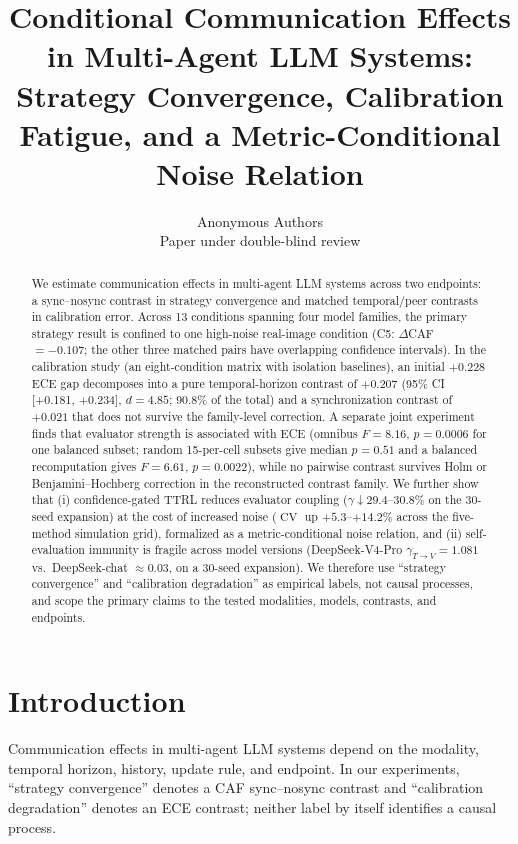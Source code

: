 \documentclass[11pt]{article}
\title{Conditional Communication Effects in Multi-Agent LLM Systems: Strategy Convergence, Calibration Fatigue, and a Metric-Conditional Noise Relation}
\author{Anonymous Authors\\Paper under double-blind review}
\date{}
\DeclareMathOperator{\CV}{CV}
\begin{document}
\maketitle

\begin{abstract}
We estimate communication effects in multi-agent LLM systems across two endpoints: a sync--nosync contrast in strategy convergence and matched temporal/peer contrasts in calibration error. Across 13 conditions spanning four model families, the primary strategy result is confined to one high-noise real-image condition (C5: $\Delta$CAF $=-0.107$; the other three matched pairs have overlapping confidence intervals). In the calibration study (an eight-condition matrix with isolation baselines), an initial $+0.228$ ECE gap decomposes into a pure temporal-horizon contrast of $+0.207$ (95\% CI [+0.181, +0.234], $d{=}4.85$; 90.8\% of the total) and a synchronization contrast of $+0.021$ that does not survive the family-level correction. A separate joint experiment finds that evaluator strength is associated with ECE (omnibus $F{=}8.16$, $p{=}0.0006$ for one balanced subset; random 15-per-cell subsets give median $p{=}0.51$ and a balanced recomputation gives $F{=}6.61$, $p{=}0.0022$), while no pairwise contrast survives Holm or Benjamini--Hochberg correction in the reconstructed contrast family. We further show that (i) confidence-gated TTRL reduces evaluator coupling ($\gamma \downarrow 29.4$--$30.8\%$ on the 30-seed expansion) at the cost of increased noise ($\CV$ up $+5.3$--$+14.2\%$ across the five-method simulation grid), formalized as a metric-conditional noise relation, and (ii) self-evaluation immunity is fragile across model versions (DeepSeek-V4-Pro $\gamma_{T\to V}{=}1.081$ vs.\ DeepSeek-chat $\approx 0.03$, on a 30-seed expansion). We therefore use ``strategy convergence'' and ``calibration degradation'' as empirical labels, not causal processes, and scope the primary claims to the tested modalities, models, contrasts, and endpoints.
\end{abstract}

\section{Introduction}

Communication effects in multi-agent LLM systems depend on the modality, temporal horizon, history, update rule, and endpoint. In our experiments, ``strategy convergence'' denotes a CAF sync--nosync contrast and ``calibration degradation'' denotes an ECE contrast; neither label by itself identifies a causal process.
\end{document}
